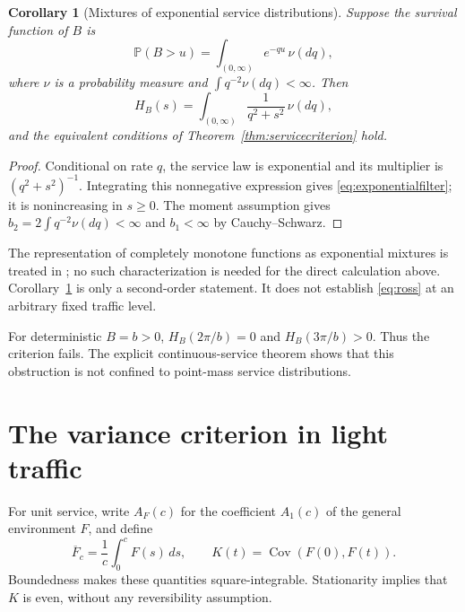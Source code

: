 \documentclass[10pt,a4paper]{amsart}
\numberwithin{equation}{section}
\newtheorem{corollary}[theorem]{Corollary}
\newcommand{\Pp}{\mathbb P}
\newcommand{\1}{\mathbf 1}
\DeclareMathOperator{\Cov}{Cov}
\begin{document}
\begin{corollary}[Mixtures of exponential service distributions]\label{cor:exponential}
Suppose the survival function of $B$ is
\[
 \Pp(B>u)=\int_{(0,\infty)}e^{-qu}\,\nu(dq),
\]
where $\nu$ is a probability measure and $\int q^{-2}\nu(dq)<\infty$. Then
\begin{equation}\label{eq:exponentialfilter}
 H_B(s)=\int_{(0,\infty)}\frac{1}{q^2+s^2}\,\nu(dq),
\end{equation}
and the equivalent conditions of Theorem~\ref{thm:servicecriterion} hold.
\end{corollary}
\begin{proof}
Conditional on rate $q$, the service law is exponential and its multiplier is $(q^2+s^2)^{-1}$. Integrating this nonnegative expression gives \eqref{eq:exponentialfilter}; it is nonincreasing in $s\ge0$. The moment assumption gives $b_2=2\int q^{-2}\nu(dq)<\infty$ and $b_1<\infty$ by Cauchy--Schwarz.
\end{proof}
The representation of completely monotone functions as exponential mixtures is treated in \cite{SSV12}; no such characterization is needed for the direct calculation above. Corollary~\ref{cor:exponential} is only a second-order statement. It does not establish \eqref{eq:ross} at an arbitrary fixed traffic level.

For deterministic $B=b>0$, $H_B(2\pi/b)=0$ and $H_B(3\pi/b)>0$. Thus the criterion fails. The explicit continuous-service theorem shows that this obstruction is not confined to point-mass service distributions.

\section{The variance criterion in light traffic}\label{sec:variance}
For unit service, write $A_F(c)$ for the coefficient $A_1(c)$ of the general environment $F$, and define
\begin{equation}\label{eq:average}
 \overline F_c=\frac1c\int_0^c F(s)\,ds,
 \qquad K(t)=\Cov(F(0),F(t)).
\end{equation}
Boundedness makes these quantities square-integrable. Stationarity implies that $K$ is even, without any reversibility assumption.
\end{document}

